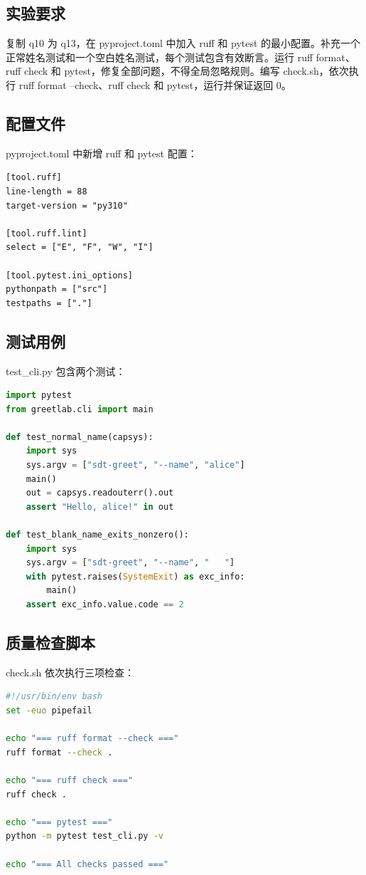 \documentclass[UTF8]{ctexart}
\begin{document}
\subsection{实验要求}

复制 q10 为 q13，在 pyproject.toml 中加入 ruff 和 pytest 的最小配置。补充一个正常姓名测试和一个空白姓名测试，每个测试包含有效断言。运行 ruff format、ruff check 和 pytest，修复全部问题，不得全局忽略规则。编写 check.sh，依次执行 ruff format --check、ruff check 和 pytest，运行并保证返回 0。

\subsection{配置文件}

pyproject.toml 中新增 ruff 和 pytest 配置：

\begin{lstlisting}
[tool.ruff]
line-length = 88
target-version = "py310"

[tool.ruff.lint]
select = ["E", "F", "W", "I"]

[tool.pytest.ini_options]
pythonpath = ["src"]
testpaths = ["."]
\end{lstlisting}

\subsection{测试用例}

test\_cli.py 包含两个测试：

\begin{lstlisting}[language=Python]
import pytest
from greetlab.cli import main

def test_normal_name(capsys):
    import sys
    sys.argv = ["sdt-greet", "--name", "alice"]
    main()
    out = capsys.readouterr().out
    assert "Hello, alice!" in out

def test_blank_name_exits_nonzero():
    import sys
    sys.argv = ["sdt-greet", "--name", "   "]
    with pytest.raises(SystemExit) as exc_info:
        main()
    assert exc_info.value.code == 2
\end{lstlisting}

\subsection{质量检查脚本}

check.sh 依次执行三项检查：

\begin{lstlisting}[language=bash]
#!/usr/bin/env bash
set -euo pipefail

echo "=== ruff format --check ==="
ruff format --check .

echo "=== ruff check ==="
ruff check .

echo "=== pytest ==="
python -m pytest test_cli.py -v

echo "=== All checks passed ==="
\end{lstlisting}
\end{document}
